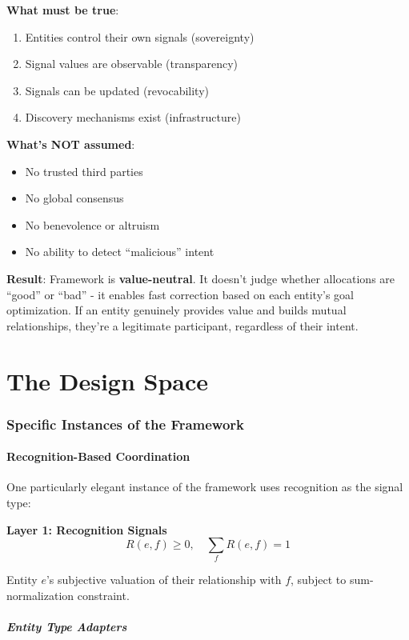 \documentclass[11pt,a4paper]{article}
\theoremstyle{definition}
\theoremstyle{remark}
\begin{document}
\textbf{What must be true}:
\begin{enumerate}
\item Entities control their own signals (sovereignty)
\item Signal values are observable (transparency)
\item Signals can be updated (revocability)
\item Discovery mechanisms exist (infrastructure)
\end{enumerate}

\textbf{What's NOT assumed}:
\begin{itemize}
\item No trusted third parties
\item No global consensus
\item No benevolence or altruism
\item No ability to detect ``malicious'' intent
\end{itemize}

\textbf{Result}: Framework is \textbf{value-neutral}. It doesn't judge whether allocations are ``good'' or ``bad'' - it enables fast correction based on each entity's goal optimization. If an entity genuinely provides value and builds mutual relationships, they're a legitimate participant, regardless of their intent.

\part{The Design Space}

\section{Specific Instances of the Framework}

\subsection{Recognition-Based Coordination}

One particularly elegant instance of the framework uses recognition as the signal type:

\textbf{Layer 1: Recognition Signals}
\[ R(e,f) \ge 0, \quad \sum_f R(e,f) = 1 \]

Entity $e$'s subjective valuation of their relationship with $f$, subject to sum-normalization constraint.

\subsubsection{Entity Type Adapters}
\end{document}
